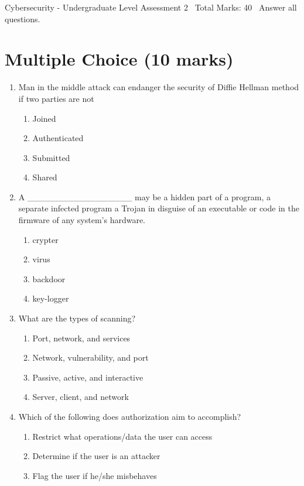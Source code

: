 \documentclass[12pt]{article}
\begin{document}
\begin{center}
Cybersecurity - Undergraduate Level Assessment 2 \
Total Marks: 40 \
Answer all questions.
\end{center}

\section*{Multiple Choice (10 marks)}
\begin{enumerate}[label=\arabic*.]
\item Man in the middle attack can endanger the security of Diffie Hellman method if two parties are not
\begin{enumerate}[label=(\alph*)]
    \item Joined
    \item Authenticated
    \item Submitted
    \item Shared
\end{enumerate}
\item A \_\_\_\_\_\_\_\_\_\_\_\_\_\_\_\_\_ may be a hidden part of a program, a separate infected program a Trojan in disguise of an executable or code in the firmware of any system's hardware.
\begin{enumerate}[label=(\alph*)]
    \item crypter
    \item virus
    \item backdoor
    \item key-logger
\end{enumerate}
\item What are the types of scanning?
\begin{enumerate}[label=(\alph*)]
    \item Port, network, and services
    \item Network, vulnerability, and port
    \item Passive, active, and interactive
    \item Server, client, and network
\end{enumerate}
\item Which of the following does authorization aim to accomplish?
\begin{enumerate}[label=(\alph*)]
    \item Restrict what operations/data the user can access
    \item Determine if the user is an attacker
    \item Flag the user if he/she misbehaves

\end{enumerate}
\end{enumerate}
\end{document}
